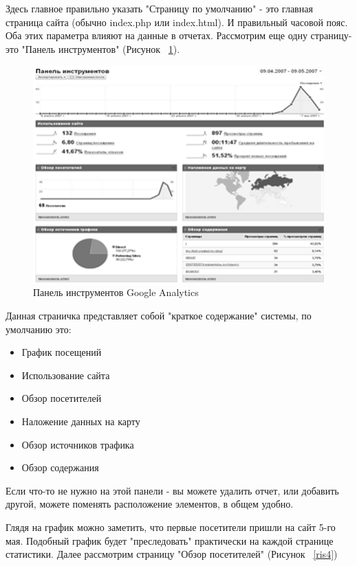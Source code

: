 \documentclass[a4paper,english,russian]{G2-105}
\begin{document}
\par Здесь главное правильно указать "Страницу по умолчанию" - это главная страница сайта (обычно index.php или index.html). И правильный часовой пояс. Оба этих параметра влияют на данные в отчетах.
Рассмотрим еще одну страницу- это "Панель инструментов" (Рисунок ~\ref{ris3}).
\begin{figure}
    \includegraphics[width=\linewidth]{ris3.png}
    \caption{Панель инструментов Google Analytics}
	\label{ris3}
\end{figure}
\par Данная страничка представляет собой "краткое содержание" системы, по умолчанию это:
\begin{itemize}
\item График посещений
\item Использование сайта
\item Обзор посетителей
\item Наложение данных на карту
\item Обзор источников трафика
\item Обзор содержания
\end{itemize}
\par Если что-то не нужно на этой панели - вы можете удалить отчет, или добавить другой, можете поменять расположение элементов, в общем удобно.
\par Глядя на график можно заметить, что первые посетители пришли на сайт 5-го мая. Подобный график будет "преследовать" практически на каждой странице статистики. Далее рассмотрим страницу "Обзор посетителей" (Рисунок ~\ref{ris4})
\end{document}
